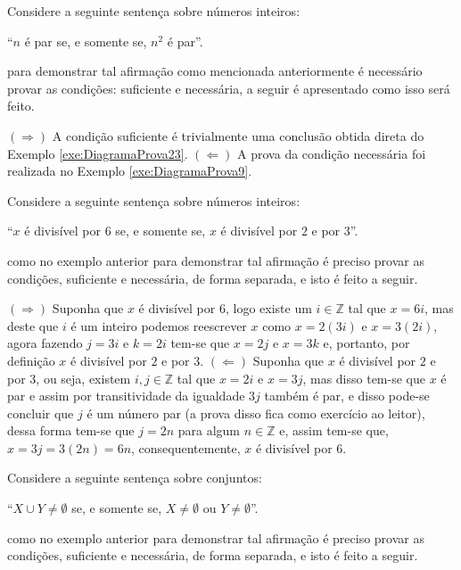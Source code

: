 \begin{exemplo}\label{exe:ProvaIff1}
	Considere a seguinte sentença sobre números inteiros:
	\begin{center}
		``$n$ é par se, e somente se, $n^2$ é par''.
	\end{center}
	para demonstrar tal afirmação como mencionada anteriormente é necessário provar as condições: suficiente e necessária, a seguir é apresentado como isso será feito.
\end{exemplo}

\begin{prova}
	$(\Rightarrow)$ A condição suficiente é trivialmente uma conclusão obtida direta do Exemplo \ref{exe:DiagramaProva23}. $(\Leftarrow)$ A prova da condição necessária foi realizada no Exemplo \ref{exe:DiagramaProva9}.
\end{prova}

\begin{exemplo}\label{exe:ProvaIff2}
	Considere a seguinte sentença sobre números inteiros:
	\begin{center}
		``$x$ é divisível por $6$ se, e somente se, $x$ é divisível por $2$ e por $3$''.
	\end{center}
	como no exemplo anterior para demonstrar tal afirmação é preciso provar as condições, suficiente e necessária, de forma separada, e isto é feito a seguir.
\end{exemplo}

\begin{prova}
		$(\Rightarrow)$ Suponha que $x$ é divisível por $6$, logo existe um $i \in \mathbb{Z}$ tal que $x = 6i$, mas deste que $i$ é um inteiro podemos reescrever $x$ como $x = 2(3i)$ e $x = 3(2i)$, agora fazendo $j = 3i$ e $k = 2i$ tem-se que $x = 2j$ e $x = 3k$ e, portanto, por definição $x$ é divisível por $2$ e por $3$. $(\Leftarrow)$ Suponha que $x$ é divisível por $2$ e por $3$, ou seja, existem $i, j \in \mathbb{Z}$ tal que $x = 2i$ e $x = 3j$, mas disso tem-se que $x$ é par e assim por transitividade da igualdade $3j$ também é par, e disso pode-se concluir que $j$ é um número par (a prova disso fica como exercício ao leitor), dessa forma tem-se que $j = 2n$ para algum $n \in \mathbb{Z}$ e, assim tem-se que, $x = 3j = 3(2n) = 6n$, consequentemente, $x$ é divisível por $6$.
\end{prova}

\begin{exemplo}\label{exe:ProvaIff3}
	Considere a seguinte sentença sobre conjuntos:
	\begin{center}
		``$X \cup Y \neq \emptyset$ se, e somente se, $X \neq \emptyset$ ou $Y \neq \emptyset$''.
	\end{center}
	como no exemplo anterior para demonstrar tal afirmação é preciso provar as condições, suficiente e necessária, de forma separada, e isto é feito a seguir.
\end{exemplo}

